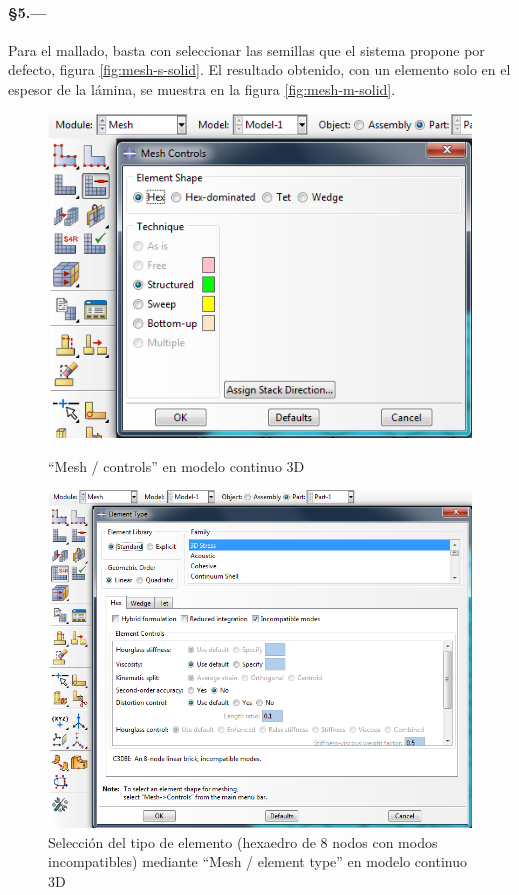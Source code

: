 \documentclass[spanish,a4paper,12pt]{article}
\begin{document}
\paragraph{\S5.---}
Para el mallado, basta con seleccionar las semillas que el sistema propone por defecto,
figura \ref{fig:mesh-s-solid}. 
El resultado obtenido, con un elemento solo en el espesor de la lámina, se muestra en la
figura \ref{fig:mesh-m-solid}. 
\begin{figure}[h!tp]
\parbox[t]{0.39\textwidth}{%
\includegraphics[width=\linewidth]{capturas/42-mesh-solid.png}
\caption{``Mesh / controls'' en modelo continuo 3D}
\label{fig:mesh-c-solid}
}\quad
\parbox[t]{0.59\textwidth}{%
\includegraphics[width=\linewidth]{capturas/43-mesh-solid.png}
\caption{Selección del tipo de elemento (hexaedro de 8 nodos con modos incompatibles) mediante ``Mesh / element type'' en modelo continuo 3D}
\label{fig:mesh-e-solid}
}%
\end{figure}
\end{document}
